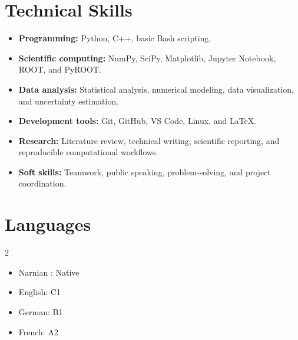 \documentclass[11pt]{article}
\begin{document}

\section{
    \texorpdfstring{%
    \makebox[\widthof{\faWrench}][c]{
        \color{NA_Red}{\faWrench}
    }\quad Technical Skills
    }
    {
    Technical Skills
    }
}

\begin{itemize}
    \item \textbf{Programming:} Python, C++, basic Bash scripting.
    \item \textbf{Scientific computing:} NumPy, SciPy, Matplotlib,
    Jupyter Notebook, ROOT, and PyROOT.
    \item \textbf{Data analysis:} Statistical analysis, numerical modeling,
    data visualization, and uncertainty estimation.
    \item \textbf{Development tools:} Git, GitHub, VS Code, Linux,
    and \LaTeX.
    \item \textbf{Research:} Literature review, technical writing,
    scientific reporting, and reproducible computational workflows.
    \item \textbf{Soft skills:} Teamwork, public speaking,
    problem-solving, and project coordination.
\end{itemize}





\section{
    \texorpdfstring{
    \makebox[\widthof{\faLanguage}][c]{
        \color{NA_Red}{\faLanguage}
    }\quad Languages
    }{
    Languages
    }
}

\begin{multicols}{2}
    \begin{itemize}
        \item Narnian : Native
        \item English: C1
        \item German: B1
        \item French: A2
    \end{itemize}
\end{multicols}
\end{document}
